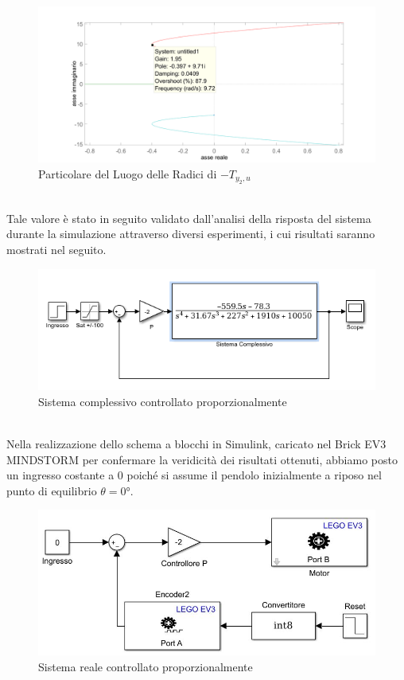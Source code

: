 \begin{figure}[ht]
	\centering
	\includegraphics[width=\textwidth]{gainOttimaleft.PNG}
	\caption{Particolare del Luogo delle Radici di $-T_{y_2,u}$}
	\label{gainOttimaleft}
\end{figure}
\\Tale valore è stato in seguito validato dall'analisi della risposta del sistema  durante la simulazione attraverso diversi esperimenti, i cui risultati saranno mostrati nel seguito.
\begin{figure}[ht]
	\centering
	\includegraphics[width=\textwidth]{SisComplessivoPNRetroazionato.PNG}
	\caption{Sistema complessivo controllato proporzionalmente}
	\label{SisComplessivoPNRetroazionato}
\end{figure}
\\Nella realizzazione dello schema a blocchi in Simulink, caricato nel Brick EV3 MINDSTORM per confermare la veridicità dei risultati ottenuti, abbiamo posto un ingresso costante a 0 poiché si assume il pendolo inizialmente a riposo nel punto di equilibrio $\theta=\ang{0}$.
\begin{figure}[ht]
	\centering
	\includegraphics[width=\textwidth]{pendoloReale.jpg}
	\caption{Sistema reale controllato proporzionalmente}
	\label{pendoloReale}
\end{figure}
